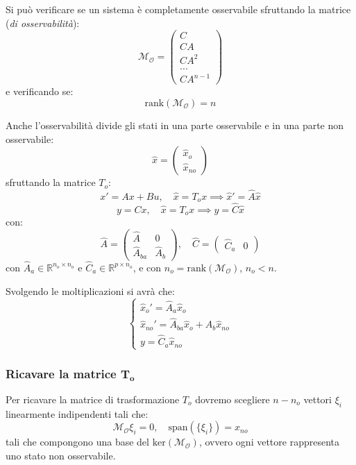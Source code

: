 \documentclass[a4paper,11pt]{article}
\begin{document}
Si può verificare se un sistema è completamente osservabile sfruttando la matrice (\textit{di osservabilità}):
$$
\mathcal{M}_\mathcal{O} = \begin{pmatrix}
C \\ 
C A \\
C A^2 \\
... \\
C A^{n - 1}
\end{pmatrix}
$$
e verificando se:
$$
\mathrm{rank}(\mathcal{M}_\mathcal{O}) = n
$$

Anche l'osservabilità divide gli stati in una parte osservabile e in una parte non osservabile:
$$
\hat{x} = \begin{pmatrix}
	\hat{x}_o \\ 
	\hat{x}_{no}
\end{pmatrix}
$$
sfruttando la matrice $T_o$:
$$
x' = Ax + Bu, \quad \hat{x} = T_o x \implies \hat{x}' = \hat{A} \hat{x} 
$$
$$
y = Cx, \quad \hat{x} = T_o x \implies y = \hat{C} \hat{x}
$$
con:
$$
\hat{A} = \begin{pmatrix}
	\hat{A} & 0 \\ 
	\hat{A}_{ba} & \hat{A}_b
\end{pmatrix}, \quad 
\hat{C} = \begin{pmatrix}
	\hat{C}_a & 0
\end{pmatrix}
$$
con $\hat{A}_a \in \mathbb{R}^{n_o \times n_o}$ e $\hat{C}_a \in \mathbb{R}^{p \times n_o}$, e con $n_o = \mathrm{rank}(\mathcal{M}_\mathcal{O})$, $n_o < n$.

Svolgendo le moltiplicazioni si avrà che:
\[
	\begin{cases}
		\hat{x}_{o}' = \hat{A}_a \hat{x}_{o} \\	
		\hat{x}_{no}' = \hat{A}_{ba} \hat{x}_{o} + \hat{A}_{b} \hat{x}_{no} \\
		y = \hat{C}_a \hat{x}_{no}
	\end{cases}
\]

\subsubsection{Ricavare la matrice $\mathbf{T_o}$}
Per ricavare la matrice di trasformazione $T_o$ dovremo scegliere $n - n_o$ vettori $\xi_i$ linearmente indipendenti tali che:
$$
\mathcal{M}_\mathcal{O} \xi_i = 0, \quad \mathrm{span}\left( \{ \xi_i \} \right) = x_{no}
$$
tali che compongono una base del $\mathrm{ker}(\mathcal{M}_\mathcal{O})$, ovvero ogni vettore rappresenta uno stato non osservabile.
\end{document}
